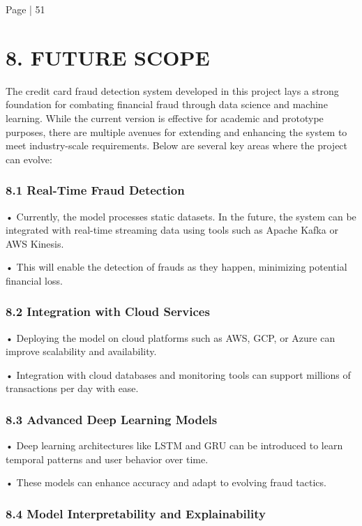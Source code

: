 \documentclass[11pt,a4paper]{article}
\begin{document}
Page | 51  

\newpage

\section*{8. FUTURE SCOPE }

The credit card fraud detection system developed in this project lays a strong foundation for 
combating financial fraud through data science and machine learning. While the current version is 
effective for academic and prototype purposes, there are multiple avenues for extending and 
enhancing the system to meet industry-scale requirements. Below are several key areas where the 
project can evolve: 

\subsubsection*{8.1 Real-Time Fraud Detection }

• 
Currently, the model processes static datasets. In the future, the system can be integrated 
with real-time streaming data using tools such as Apache Kafka or AWS Kinesis. 

• 
This will enable the detection of frauds as they happen, minimizing potential financial loss. 

\subsubsection*{8.2 Integration with Cloud Services }

• 
Deploying the model on cloud platforms such as AWS, GCP, or Azure can improve 
scalability and availability. 

• 
Integration with cloud databases and monitoring tools can support millions of transactions 
per day with ease. 

\subsubsection*{8.3 Advanced Deep Learning Models }

• 
Deep learning architectures like LSTM and GRU can be introduced to learn temporal 
patterns and user behavior over time. 

• 
These models can enhance accuracy and adapt to evolving fraud tactics. 

\subsubsection*{8.4 Model Interpretability and Explainability }
\end{document}
